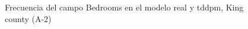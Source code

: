 \begin{figure}[H]
    \centering
    
    \caption{Frecuencia del campo Bedrooms en el modelo real y tddpm, King county (A-2)}
    \label{frecuency-tddpm-bedrooms}
\end{figure}